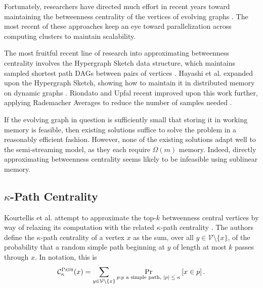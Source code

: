 \documentclass{report}
\newcommand{\algoname}[1]{\textnormal{\textsc{#1}}}
\begin{document}
Fortunately, researchers have directed much effort in recent years toward maintaining the betweenness centrality of the vertices of evolving graphs \cite{green2012fast, wei2014real, kourtellis2015scalable}. 
The most recent of these approaches keep an eye toward parallelization across computing clusters to maintain scalability.

The most fruitful recent line of research into approximating betweenness centrality involves the Hypergraph Sketch data structure,  which maintains sampled shortest path DAGs between pairs of vertices \cite{yoshida2014almost}. 
Hayashi et al. expanded upon the Hypergraph Sketch, showing how to maintain it in distributed memory on dynamic graphs \cite{hayashi2015fully}. 
Riondato and Upfal recent improved upon this work further, applying Rademacher Averages to reduce the number of samples needed \cite{riondato2018abra}.

If the evolving graph in question is sufficiently small that storing it in working memory is feasible, then existing solutions suffice to solve the problem in a reasonably efficient fashion. 
However, none of the existing solutions adapt well to the semi-streaming model, as they each require $\Omega(m)$ memory. 
Indeed, directly approximating betweenness centrality seems likely to be infeasible using sublinear memory.


\subsection{$\kappa$-Path Centrality} 
\label{sec:kpc}

Kourtellis et al. attempt to approximate the top-$k$ betweenness central vertices by way of relaxing its computation with the related $\kappa$-path centrality \cite{alahakoon2011k, kourtellis2013identifying}.
The authors define the $\kappa$-path centrality of a vertex $x$ as the sum, over all $y \in \mathcal{V} \setminus \{x\}$, of the probability that a random simple path beginning at $y$ of length at most $k$ passes through $x$. 
In notation, this is 
%
\begin{equation} \label{eq:kpath}
	\mathcal{C}^{\algoname{Path}}_\kappa(x) = \sum\limits_{y \in \mathcal{V} \setminus \{x\}} 
		\Pr_{p: \textnormal{$p$ a simple path, $|p| \leq \kappa$}}
 		\left [ x \in p \right ].
\end{equation}
%
\end{document}
